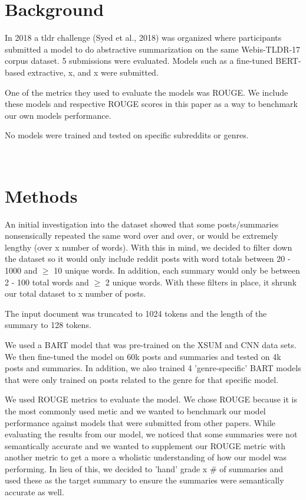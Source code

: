 \documentclass[11pt,a4paper, twocolumn]{article}
\begin{document}
\section{Background}
\label{sec:length}

In 2018 a tldr challenge (Syed et al., 2018) was organized where participants submitted a model to do abstractive summarization on the same Webis-TLDR-17 corpus dataset. 5 submissions were evaluated. Models such as a fine-tuned BERT-based extractive, x, and x were submitted.

One of the metrics they used to evaluate the models was ROUGE. We include these models and respective ROUGE scores in this paper as a way to benchmark our own models performance.

No models were trained and tested on specific subreddits or genres.


\\

\section{Methods}

An initial investigation into the dataset showed that some posts/summaries nonsensically repeated the same word over and over, or would be extremely lengthy (over x number of words). With this in mind, we decided to filter down the dataset so it would only include reddit posts with word totals between 20 - 1000 and $\geq$ 10 unique words. In addition, each summary would only be between 2 - 100 total words and $\geq$ 2 unique words. With these filters in place, it shrunk our total dataset to x number of posts.

The input document was truncated to 1024 tokens and the length of the summary to 128 tokens. 

We used a BART model that was pre-trained on the XSUM and CNN data sets. We then fine-tuned the model on 60k posts and summaries and tested on 4k posts and summaries. In addition, we also trained 4 'genre-specific' BART models that were only trained on posts related to the genre for that specific model. 

We used ROUGE metrics to evaluate the model. We chose ROUGE because it is the most commonly used metic and we wanted to benchmark our model performance against models that were submitted from other papers. While evaluating the results from our model, we noticed that some summaries were not semantically accurate and we wanted to supplement our ROUGE metric with another metric to get a more a wholistic understanding of how our model was performing. In lieu of this, we decided to 'hand' grade x # of summaries and used these as the target summary to ensure the summaries were semantically accurate as well. 
\end{document}
